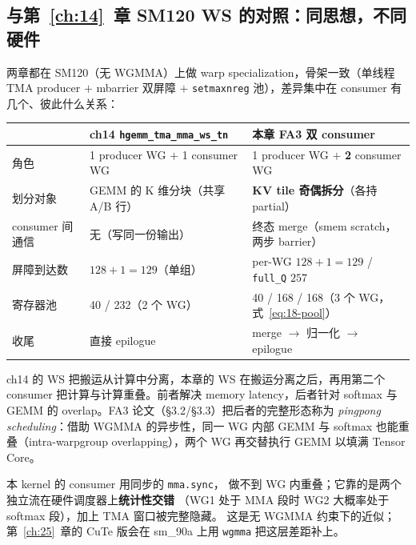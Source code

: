 \subsection{与第~\ref{ch:14}~章 SM120 WS 的对照：同思想，不同硬件}

两章都在 SM120（无 WGMMA）上做 warp specialization，骨架一致（单线程 TMA
producer $+$ mbarrier 双屏障 $+$ \texttt{setmaxnreg} 池），差异集中在
consumer 有几个、彼此什么关系：

\begin{center}
\begin{tabular}{lll}
\toprule
 & ch14 \texttt{hgemm\_\allowbreak{}tma\_\allowbreak{}mma\_\allowbreak{}ws\_\allowbreak{}tn} & 本章 FA3 双 consumer \\
\midrule
角色 & 1 producer WG $+$ 1 consumer WG & 1 producer WG $+$ \textbf{2} consumer WG \\
划分对象 & GEMM 的 K 维分块（共享 A/B 行） & \textbf{KV tile 奇偶拆分}（各持 partial） \\
consumer 间通信 & 无（写同一份输出） & 终态 merge（smem scratch，两步 barrier）\\
屏障到达数 & $128 + 1 = 129$（单组） & per-WG $128{+}1{=}129$ / \texttt{full\_Q} $257$ \\
寄存器池 & 40 / 232（2 个 WG） & 40 / 168 / 168（3 个 WG，式~\ref{eq:18-pool}）\\
收尾 & 直接 epilogue & merge $\to$ 归一化 $\to$ epilogue \\
\bottomrule
\end{tabular}
\end{center}

ch14 的 WS 把搬运从计算中分离，本章的 WS 在搬运分离之后，再用第二个
consumer 把计算与计算重叠。前者解决 memory latency，后者针对
softmax 与 GEMM 的 overlap。FA3 论文（§3.2/§3.3）把后者的完整形态称为
\emph{pingpong scheduling}：借助 WGMMA 的异步性，同一 WG 内部 GEMM 与
softmax 也能重叠（intra-warpgroup overlapping），两个 WG 再交替执行 GEMM
以填满 Tensor Core。

本 kernel 的 consumer 用同步的 \texttt{mma.sync}，
做不到 WG 内重叠；它靠的是两个独立流在硬件调度器上\textbf{统计性交错}
（WG1 处于 MMA 段时 WG2 大概率处于 softmax 段），加上 TMA 窗口被完整隐藏。
这是无 WGMMA 约束下的近似；第~\ref{ch:25}~章的 CuTe 版会在 sm\_90a 上用
\texttt{wgmma} 把这层差距补上。

